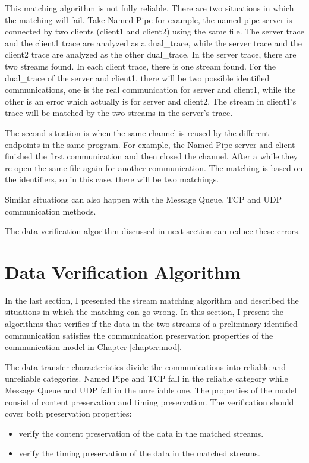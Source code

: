 This matching algorithm is not fully reliable. There are two situations in which the matching will fail. Take Named Pipe for example, the named pipe server is connected by two clients (client1 and client2) using the same file. The server trace and the client1 trace are analyzed as a dual\_trace, while the server trace and the client2 trace are analyzed as the other dual\_trace. In the server trace, there are two streams found. In each client trace, there is one stream found. For the dual\_trace of the server and client1, there will be two possible identified communications, one is the real communication for server and client1, while the other is an error which actually is for server and client2. The stream in client1's trace will be matched by the two streams in the server's trace. 

The second situation is when the same channel is reused by the different endpoints in the same program. For example, the Named Pipe server and client finished the first communication and then closed the channel. After a while they re-open the same file again for another communication. The matching is based on the identifiers, so in this case, there will be two matchings.

Similar situations can also happen with the Message Queue, TCP and UDP communication methods. 

The data verification algorithm discussed in next section can reduce these errors. 

\section{Data Verification Algorithm}\label{verfication}
In the last section, I presented the stream matching algorithm and described the situations in which the matching can go wrong. In this section, I present the algorithms that verifies if the data in the two streams of a preliminary identified communication satisfies the communication preservation properties of the communication model in Chapter \ref{chapter:mod}. 

The data transfer characteristics divide the communications into reliable and unreliable categories. Named Pipe and TCP fall in the reliable category while Message Queue and UDP fall in the unreliable one. The properties of the model consist of content preservation and timing preservation. The verification should cover both preservation properties: 
\begin{itemize}
\item verify the content preservation of the data in the matched streams. 
\item verify the timing preservation of the data in the matched streams. 
\end{itemize}

